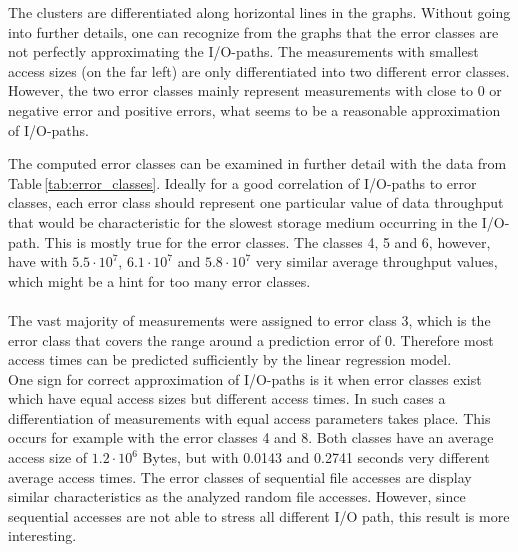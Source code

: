 \documentclass{superfri}
\begin{document}
The clusters are differentiated along horizontal lines in the graphs.
Without going into further details, one can recognize from the graphs that the error classes are not perfectly approximating the I/O-paths.
The measurements with smallest access sizes (on the far left) are only differentiated into two different error classes.
However, the two error classes mainly represent measurements with close to 0 or negative error and positive errors, what seems to be a reasonable approximation of I/O-paths.\medskip

The computed error classes can be examined in further detail with the data from Table\,\ref{tab:error_classes}.
Ideally for a good correlation of I/O-paths to error classes, each error class should represent one particular value of data throughput that would be characteristic for the slowest storage medium occurring in the I/O-path. 
This is mostly true for the error classes. The classes 4, 5 and 6, however, have with $5.5\cdot10^7$, $6.1\cdot10^7$ and $5.8\cdot10^7$ very similar average throughput values, which might be a hint for too many error classes.\\
\\
The vast majority of measurements were assigned to error class 3, which is the error class that covers the range around a prediction error of 0.
Therefore most access times can be predicted sufficiently by the linear regression model.\\
One sign for correct approximation of I/O-paths is it when error classes exist which have equal access sizes but different access times.
In such cases a differentiation of measurements with equal access parameters takes place.
This occurs for example with the error classes 4 and 8. Both classes have an average access size of $1.2\cdot10^6$ Bytes, but with 0.0143 and 0.2741 seconds very different average access times.
The error classes of sequential file accesses are display similar characteristics as the analyzed random file accesses.
However, since sequential accesses are not able to stress all different I/O path, this result is more interesting.
\end{document}
